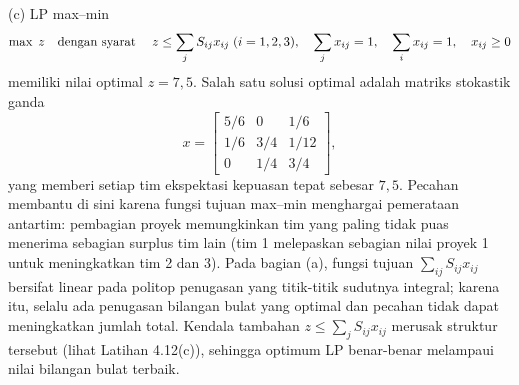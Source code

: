 (c) LP max--min
\[
\max \; z \quad \mbox{dengan syarat}\quad \; z \leq \sum_j S_{ij} x_{ij} \; (i = 1,2,3), \quad \sum_j x_{ij} = 1, \quad \sum_i x_{ij} = 1, \quad x_{ij} \geq 0
\]
memiliki nilai optimal $z = 7{,}5$. Salah satu solusi optimal adalah matriks stokastik ganda
\[
x = \begin{bmatrix} 5/6 & 0 & 1/6 \\ 1/6 & 3/4 & 1/12 \\ 0 & 1/4 & 3/4 \end{bmatrix},
\]
yang memberi setiap tim ekspektasi kepuasan tepat sebesar $7{,}5$. Pecahan membantu di sini karena fungsi tujuan max--min menghargai pemerataan antartim: pembagian proyek memungkinkan tim yang paling tidak puas menerima sebagian surplus tim lain (tim 1 melepaskan sebagian nilai proyek 1 untuk meningkatkan tim 2 dan 3). Pada bagian (a), fungsi tujuan $\sum_{ij} S_{ij} x_{ij}$ bersifat linear pada politop penugasan yang titik-titik sudutnya integral; karena itu, selalu ada penugasan bilangan bulat yang optimal dan pecahan tidak dapat meningkatkan jumlah total. Kendala tambahan $z \leq \sum_j S_{ij} x_{ij}$ merusak struktur tersebut (lihat Latihan 4.12(c)), sehingga optimum LP benar-benar melampaui nilai bilangan bulat terbaik.
